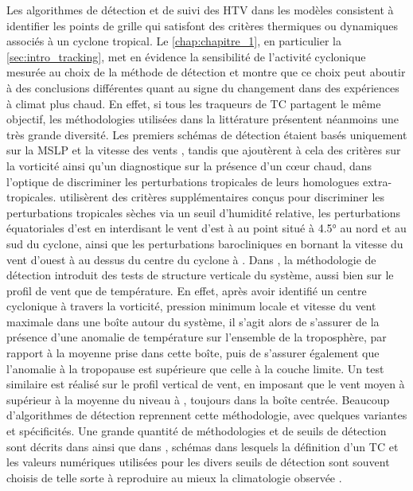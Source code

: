 \documentclass[../main.tex]{subfiles}
\begin{document}
Les algorithmes de détection et de suivi des HTV dans les modèles consistent à identifier les points de grille qui satisfont des critères thermiques ou
dynamiques associés à un cyclone tropical. Le \cref{chap:chapitre_1}, en particulier la \cref{sec:intro_tracking}, met en évidence la sensibilité de l'activité
cyclonique mesurée au choix de la méthode de détection et montre que ce choix peut aboutir à des conclusions différentes quant au signe du changement dans des
expériences à climat plus chaud. En effet, si tous les traqueurs de TC partagent le même objectif, les méthodologies utilisées dans la littérature présentent
néanmoins une très grande diversité. Les premiers schémas de détection étaient basés uniquement sur la MSLP et la vitesse des vents
\parencite{bengtsson_simulation_1982,broccoli_can_1990}, tandis que \cite{haarsma_tropical_1993,bengtsson_hurricanetype_1995} ajoutèrent à cela des critères sur
la vorticité ainsi qu'un diagnostique sur la présence d'un cœur chaud, dans l'optique de discriminer les perturbations tropicales de leurs homologues
extra-tropicales. \cite{wu_gcm_1992} utilisèrent des critères supplémentaires conçus pour discriminer les perturbations tropicales sèches via un seuil
d'humidité relative, les perturbations équatoriales d'est en interdisant le vent d'est à  au point situé à \ang{4.5} au nord et au sud du cyclone,
ainsi que les perturbations barocliniques en bornant la vitesse du vent d'ouest à  au dessus du centre du cyclone à . Dans
\cite{bengtsson_hurricanetype_1995}, la méthodologie de détection introduit des tests de structure verticale du système, aussi bien sur le profil de vent que de
température. En effet, après avoir identifié un centre cyclonique à travers la vorticité, pression minimum locale et vitesse du vent maximale dans une boîte
autour du système, il s'agit alors de s'assurer de la présence d'une anomalie de température sur l'ensemble de la troposphère, par rapport à la moyenne prise
dans cette boîte, puis de s'assurer également que l'anomalie à la tropopause est supérieure que celle à la couche limite. Un test similaire est réalisé sur le
profil vertical de vent, en imposant que le vent moyen à  supérieur à la moyenne du niveau à , toujours dans la boîte centrée. Beaucoup
d'algorithmes de détection reprennent cette méthodologie, avec quelques variantes et spécificités. Une grande quantité de méthodologies et de seuils de
détection sont décrits dans \cite{walsh_objectively_2007} ainsi que dans \cite[][Annexe B]{ullrich_tempestextremes_2017}, schémas dans lesquels la définition
d'un TC et les valeurs numériques utilisées pour les divers seuils de détection sont souvent choisis de telle sorte à reproduire au mieux la climatologie
observée \parencite{walsh_objectively_2007,tory_development_2013}.
\end{document}
